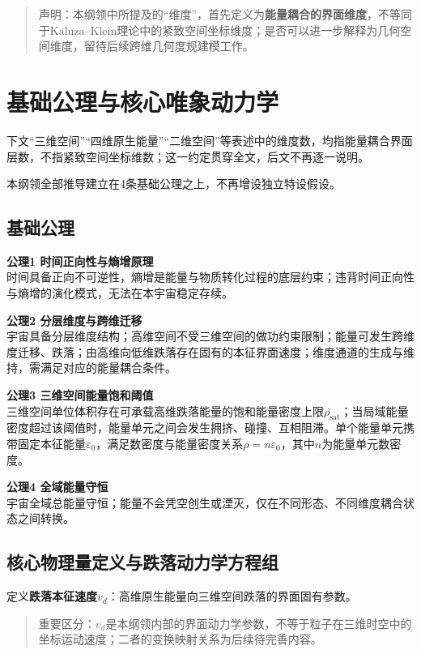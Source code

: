 \documentclass[UTF8]{csoarticle}
\begin{document}
\begin{quote}
声明：本纲领中所提及的“维度”，首先定义为\textbf{能量耦合的界面维度}，不等同于Kaluza–Klein理论中的紧致空间坐标维度；是否可以进一步解释为几何空间维度，留待后续跨维几何度规建模工作。
\end{quote}

\section{基础公理与核心唯象动力学}
下文“三维空间”“四维原生能量”“二维空间”等表述中的维度数，均指能量耦合界面层数，不指紧致空间坐标维数；这一约定贯穿全文，后文不再逐一说明。

本纲领全部推导建立在4条基础公理之上，不再增设独立特设假设。

\subsection{基础公理}
\noindent\textbf{公理1 时间正向性与熵增原理}\\
时间具备正向不可逆性，熵增是能量与物质转化过程的底层约束；违背时间正向性与熵增的演化模式，无法在本宇宙稳定存续。

\noindent\textbf{公理2 分层维度与跨维迁移}\\
宇宙具备分层维度结构；高维空间不受三维空间的做功约束限制；能量可发生跨维度迁移、跌落；由高维向低维跌落存在固有的本征界面速度；维度通道的生成与维持，需满足对应的能量耦合条件。

\noindent\textbf{公理3 三维空间能量饱和阈值}\\
三维空间单位体积存在可承载高维跌落能量的饱和能量密度上限$\rho_{\text{sat}}$；当局域能量密度超过该阈值时，能量单元之间会发生拥挤、碰撞、互相阻滞。单个能量单元携带固定本征能量$\varepsilon_0$，满足数密度与能量密度关系$\rho = n \varepsilon_0$，其中$n$为能量单元数密度。

\noindent\textbf{公理4 全域能量守恒}\\
宇宙全域总能量守恒；能量不会凭空创生或湮灭，仅在不同形态、不同维度耦合状态之间转换。

\subsection{核心物理量定义与跌落动力学方程组}
定义\textbf{跌落本征速度}$v_d$：高维原生能量向三维空间跌落的界面固有参数。

\begin{quote}
重要区分：$v_d$是本纲领内部的界面动力学参数，不等于粒子在三维时空中的坐标运动速度；二者的变换映射关系为后续待完善内容。
\end{quote}
\end{document}
